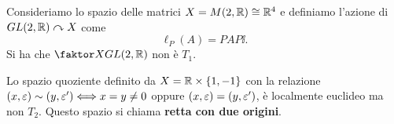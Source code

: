\begin{multicols*}{2}
\begin{example}\label{Matrici2x2QuozienteSimilitudine}
Consideriamo lo spazio delle matrici $X=M(2,\mathbb{R})\cong \mathbb{R}^4$ e definiamo l'azione di $GL(2,\mathbb{R})\curvearrowright X$ come
\[\ell_P(A)=PAP\ii.\]
Si ha che $\quot X{GL(2,\R)}$ non \`e $T_1$.
\end{example}

\begin{example}\label{LocalmenteEuclideoNonT2}
Lo spazio quoziente definito da $X=\mathbb{R}\times \{1,-1\}$ con la relazione $(x,\varepsilon)\sim(y,\varepsilon')\Longleftrightarrow x=y\neq0$ oppure $(x,\varepsilon)=(y,\varepsilon')$, \`e localmente euclideo ma non $T_2$. Questo spazio si chiama \textbf{retta con due origini}.
\end{example}
\end{multicols*}
